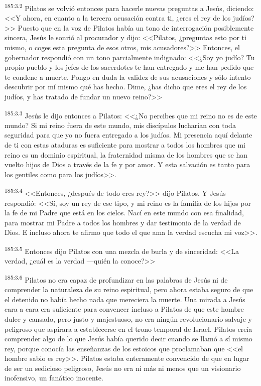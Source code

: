 \par 
\textsuperscript{185:3.2} Pilatos se volvió entonces para hacerle nuevas preguntas a Jesús, diciendo: <<Y ahora, en cuanto a la tercera acusación contra ti, ¿eres el rey de los judíos?>> Puesto que en la voz de Pilatos había un tono de interrogación posiblemente sincera, Jesús le sonrió al procurador y dijo: <<Pilatos, ¿preguntas esto por ti mismo, o coges esta pregunta de esos otros, mis acusadores?>> Entonces, el gobernador respondió con un tono parcialmente indignado: <<¿Soy yo judío? Tu propio pueblo y los jefes de los sacerdotes te han entregado y me han pedido que te condene a muerte. Pongo en duda la validez de sus acusaciones y sólo intento descubrir por mí mismo qué has hecho. Dime, ¿has dicho que eres el rey de los judíos, y has tratado de fundar un nuevo reino?>>

\par 
\textsuperscript{185:3.3} Jesús le dijo entonces a Pilatos: <<¿No percibes que mi reino no es de este mundo? Si mi reino fuera de este mundo, mis discípulos lucharían con toda seguridad para que yo no fuera entregado a los judíos. Mi presencia aquí delante de ti con estas ataduras es suficiente para mostrar a todos los hombres que mi reino es un dominio espiritual, la fraternidad misma de los hombres que se han vuelto hijos de Dios a través de la fe y por amor. Y esta salvación es tanto para los gentiles como para los judíos>>.

\par 
\textsuperscript{185:3.4} <<Entonces, ¿después de todo eres rey?>> dijo Pilatos. Y Jesús respondió: <<Sí, soy un rey de ese tipo, y mi reino es la familia de los hijos por la fe de mi Padre que está en los cielos. Nací en este mundo con esa finalidad, para mostrar mi Padre a todos los hombres y dar testimonio de la verdad de Dios. E incluso ahora te afirmo que todo el que ama la verdad escucha mi voz>>.

\par 
\textsuperscript{185:3.5} Entonces dijo Pilatos con una mezcla de burla y de sinceridad: <<La verdad, ¿cuál es la verdad ---quién la conoce?>>

\par 
\textsuperscript{185:3.6} Pilatos no era capaz de profundizar en las palabras de Jesús ni de comprender la naturaleza de su reino espiritual, pero ahora estaba seguro de que el detenido no había hecho nada que mereciera la muerte. Una mirada a Jesús cara a cara era suficiente para convencer incluso a Pilatos de que este hombre dulce y cansado, pero justo y majestuoso, no era ningún revolucionario salvaje y peligroso que aspirara a establecerse en el trono temporal de Israel. Pilatos creía comprender algo de lo que Jesús había querido decir cuando se llamó a sí mismo rey, porque conocía las enseñanzas de los estoicos que proclamaban que <<el hombre sabio es rey>>. Pilatos estaba enteramente convencido de que en lugar de ser un sedicioso peligroso, Jesús no era ni más ni menos que un visionario inofensivo, un fanático inocente.

